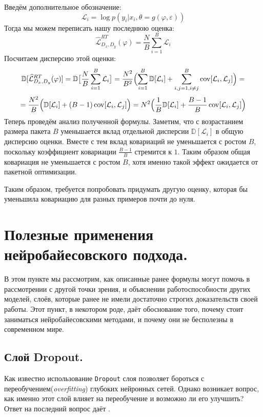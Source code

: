 Введём дополнительное обозначение:
$$\mathcal{L}_i = \log p(y_i | x_i, \theta=g(\varphi, \varepsilon))$$
Тогда мы можем переписать нашу последнюю оценка:
$$\widehat{\mathcal{L}}_{D_x, D_y}^{RT}(\varphi) = \frac{N}{B}\sum_{i=1}^B \mathcal{L}_i$$
Посчитаем дисперсию этой оценки:
$$\mathbb{D}[\widehat{\mathcal{L}}_{D_x, D_y}^{RT}(\varphi)] = \mathbb{D}\bigl[\frac{N}{B}\sum_{i=1}^B \mathcal{L}_i\bigr] = \frac{N^2}{B^2}\Bigl(\sum_{i=1}^B \mathbb{D}[\mathcal{L}_i] + \sum_{i,j=1, i\neq j}^B \operatorname*{cov}[\mathcal{L}_i, \mathcal{L}_j]\Bigr)=$$
$$=\frac{N^2}{B}\Bigl(\mathbb{D}[\mathcal{L}_i] + (B-1)\operatorname*{cov}[\mathcal{L}_i, \mathcal{L}_j]\Bigr)=N^2\Bigl(\frac{1}{B}\mathbb{D}[\mathcal{L}_i] + \frac{B-1}{B}\operatorname*{cov}[\mathcal{L}_i,\mathcal{L}_j]\Bigr)$$
Теперь проведём анализ полученной формулы. Заметим, что с возрастанием размера пакета $B$ уменьшается вклад отдельной дисперсии $\mathbb{D}[\mathcal{L}_i]$ в общую дисперсию оценки.
 Вместе с тем вклад ковариаций не уменьшается с ростом $B$, поскольку коэффициент ковариации $\frac{B - 1}{B}$ стремится к $1$. Таким образом общая ковариация
 не уменьшается с ростом $B$, хотя именно такой эффект ожидается от пакетной оптимизации.

Таким образом, требуется попробовать придумать другую оценку, которая бы уменьшила ковариацию для разных примеров почти до нуля.
\section{Полезные применения нейробайесовского подхода.}
В этом пункте мы рассмотрим, как описанные ранее формулы могут помочь в рассмотрении с другой точки зрения, и объяснении работоспособности других моделей, слоёв,
 которые ранее не имели достаточно строгих доказательств своей работы. Этот пункт, в некотором роде, даёт обоснование того, почему стоит заниматься нейробайесовскими методами, и почему они не бесполезны в современном мире.

\subsection{Слой Dropout.}
Как известно использование \verb|Dropout| слоя позволяет бороться с переобучением(\textit{overfitting}) глубоких нейронных сетей. Однако возникает вопрос, как именно
 этот слой влияет на переобучение и возможно ли его улучшить? Ответ на последний вопрос даёт \cite{localRT}.

